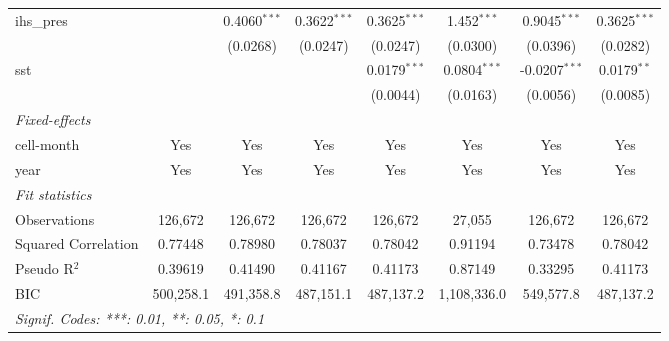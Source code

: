 \begin{tabular}{lccccccc}
   ihs\_pres                               &                 & 0.4060$^{***}$  & 0.3622$^{***}$  & 0.3625$^{***}$  & 1.452$^{***}$   & 0.9045$^{***}$  & 0.3625$^{***}$\\   
                                           &                 & (0.0268)        & (0.0247)        & (0.0247)        & (0.0300)        & (0.0396)        & (0.0282)\\   
   sst                                     &                 &                 &                 & 0.0179$^{***}$  & 0.0804$^{***}$  & -0.0207$^{***}$ & 0.0179$^{**}$\\   
                                           &                 &                 &                 & (0.0044)        & (0.0163)        & (0.0056)        & (0.0085)\\   
   \midrule
   \emph{Fixed-effects}\\
   cell-month                              & Yes             & Yes             & Yes             & Yes             & Yes             & Yes             & Yes\\  
   year                                    & Yes             & Yes             & Yes             & Yes             & Yes             & Yes             & Yes\\  
   \midrule
   \emph{Fit statistics}\\
   Observations                            & 126,672         & 126,672         & 126,672         & 126,672         & 27,055          & 126,672         & 126,672\\  
   Squared Correlation                     & 0.77448         & 0.78980         & 0.78037         & 0.78042         & 0.91194         & 0.73478         & 0.78042\\  
   Pseudo R$^2$                            & 0.39619         & 0.41490         & 0.41167         & 0.41173         & 0.87149         & 0.33295         & 0.41173\\  
   BIC                                     & 500,258.1       & 491,358.8       & 487,151.1       & 487,137.2       & 1,108,336.0     & 549,577.8       & 487,137.2\\  
   \midrule \midrule
   \multicolumn{8}{l}{\emph{Signif. Codes: ***: 0.01, **: 0.05, *: 0.1}}\\
\end{tabular}
\par\endgroup



